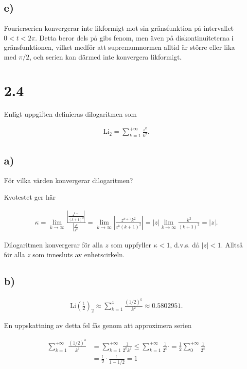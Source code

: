 \documentclass[a4paper]{article}
\begin{document}
\subsection*{e)}

Fourierserien konvergerar inte likformigt mot sin gränsfunktion på intervallet
$0 < t < 2\pi$. Detta beror dels på gibs fenom, men även på diskontinuiteterna i
gränsfunktionen, vilket medför att supremumnormen alltid är större eller lika
med $\pi/2$, och serien kan därmed inte konvergera likformigt.

\section*{2.4}

Enligt uppgiften definieras dilogaritmen som

\begin{align*}
  \text{Li}_2 = \sum_{k=1}^{+\infty}\frac{z^k}{k^2}.
\end{align*}

\subsection*{a)}

För vilka värden konvergerar dilogaritmen?

Kvotestet ger här

\begin{align*}
  \kappa = \lim_{k\to\infty}\frac{\left|\frac{z^{k+1}}{(k+1)^2}\right|}{\left|\frac{z^k}{k^2}\right|} = \lim_{k\to\infty}\left| \frac{z^{k+1}k^2}{z^k(k+1)^2}\right| = |z|\lim_{k\to\infty}\frac{k^2}{(k+1)^2} = |z|.
\end{align*}

\noindent Dilogaritmen konvergerar för alla $z$ som uppfyller $\kappa < 1$, d.v.s. då $|z|
< 1$. Alltså för alla $z$ som innesluts av enhetscirkeln.

\subsection*{b)}

\begin{align*}
  \text{Li}\left(\frac{1}{2}\right)_2 \approx \sum_{k=1}^4\frac{(1/2)^k}{k^2} \approx 0.5802951.
\end{align*}

En uppskattning av detta fel fås genom att approximera serien

\begin{align*}
  \sum_{k=1}^{+\infty}\frac{(1/2)^k}{k^2} &= \sum_{k=1}^{+\infty}\frac{1}{2^kk^2} \leq \sum_{k=1}^{+\infty}\frac{1}{2^k}\cdot = \frac{1}{2}\sum_0^{+\infty}\frac{1}{2^k}\\
                                          &= \frac{1}{2}\cdot\frac{1}{1-1/2} = 1
\end{align*}
\end{document}
